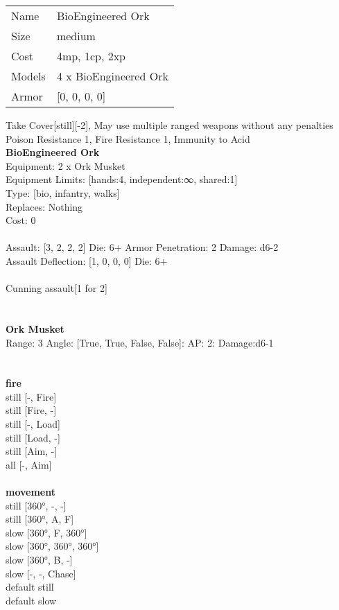 \begin{tabular}{ll}
  Name & BioEngineered Ork \\
  Size & medium\\
  Cost & 4mp, 1cp, 2xp\\
  Models & 4 x BioEngineered Ork\\
  Armor & [0, 0, 0, 0]\\
\end{tabular}

\noindent Take Cover[still][-2], May use multiple ranged weapons without any penalties\\ 
Poison Resistance 1, Fire Resistance 1, Immunity to Acid\\ 


{\bf BioEngineered Ork } \\
Equipment: 2 x Ork Musket \\
Equipment Limits: [hands:4, independent:∞, shared:1] \\
Type: [bio, infantry, walks] \\
Replaces: Nothing \\
Cost: 0\\
\ \\
Assault: [3, 2, 2, 2] Die: 6+ Armor Penetration: 2 Damage: d6-2 \\
Assault Deflection: [1, 0, 0, 0] Die: 6+\\
\\ 
Cunning assault[1 for 2]\\ 
 
\ \\

\ \\
{\bf Ork Musket } \\



Range: 3  Angle: [True, True, False, False]: AP: 2: Damage:d6-1 \\




 
\ \\



\ \\ {\bf fire } \\
still [-, Fire] \\
still [Fire, -] \\
still [-, Load] \\
still [Load, -] \\
still [Aim, -] \\
all [-, Aim] \\
\ \\ {\bf movement } \\
still [360°, -, -] \\
still [360°, A, F] \\
slow [360°, F, 360°] \\
slow [360°, 360°, 360°] \\
slow [360°, B, -] \\
slow [-, -, Chase] \\
default still \\
default slow \\


